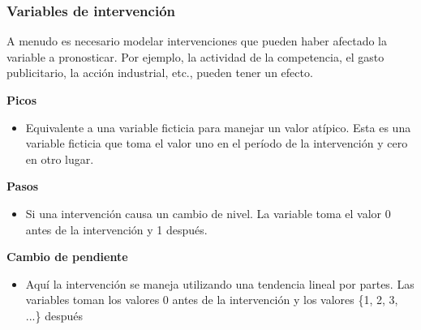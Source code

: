 \documentclass[10pt]{beamer}
\begin{document}





\begin{frame}[fragile]
\frametitle{Variables de intervención}

A menudo es necesario modelar intervenciones que pueden haber afectado la variable a pronosticar. Por ejemplo, la actividad de la competencia, el gasto publicitario, la acción industrial, etc., pueden tener un efecto.

\vspace{4mm}

\pause
\textbf{Picos}

\begin{itemize}
\item Equivalente a una variable ficticia para manejar un valor atípico. Esta es una variable ficticia que toma el valor uno en el período de la intervención y cero en otro lugar.
\end{itemize}

\vspace{4mm}
\pause

\textbf{Pasos}
\begin{itemize}
\item Si una intervención causa un cambio de nivel. La variable toma el valor 0 antes de la intervención y 1 después.
\end{itemize}

\vspace{4mm}
\pause

\textbf{Cambio de pendiente}
\begin{itemize}
\item Aquí la intervención se maneja utilizando una tendencia lineal por partes. Las variables toman los valores 0 antes de la intervención y los valores \{1, 2, 3, ...\} después
\end{itemize}


\end{frame}








\end{document}
